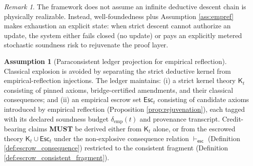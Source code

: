 \documentclass[11pt,a4paper]{article}
\newcommand{\MUST}{\textbf{MUST}}
\theoremstyle{definition}
\newtheorem{assumption}{Assumption}
\theoremstyle{remark}
\newtheorem{remark}{Remark}
\begin{document}
\begin{remark}\label{rem:lobe_exhaustion}
The framework does not assume an infinite deductive descent chain is physically realizable.
Instead, well-foundedness plus Assumption \ref{ass:empref} makes exhaustion an explicit state: when strict descent cannot authorize an update, the system either fails closed (no update) or pays an explicitly metered stochastic soundness risk to rejuvenate the proof layer.


\end{remark}

\begin{assumption}[Paraconsistent ledger projection for empirical reflection]\label{ass:paraconsistent}
Classical explosion is avoided by separating the strict deductive kernel from empirical-reflection injections.
The ledger maintains:
(i) a strict kernel theory $\mathsf K_t$ consisting of pinned axioms, bridge-certified amendments, and their classical consequences; and
(ii) an empirical escrow set $\mathsf{Esc}_t$ consisting of candidate axioms introduced by empirical reflection (Proposition \ref{prop:rejuvenation}), each tagged with its declared soundness budget $\delta_{\mathrm{emp}}(t)$ and provenance transcript.
Credit-bearing claims \MUST{} be derived either from $\mathsf K_t$ alone, or from the escrowed theory $\mathsf K_t\cup \mathsf{Esc}_t$ under the non-explosive consequence relation $\vdash_{\mathsf{esc}}$ (Definition \ref{def:escrow_consequence}) restricted to the consistent fragment (Definition \ref{def:escrow_consistent_fragment}).
\end{assumption}
\end{document}
